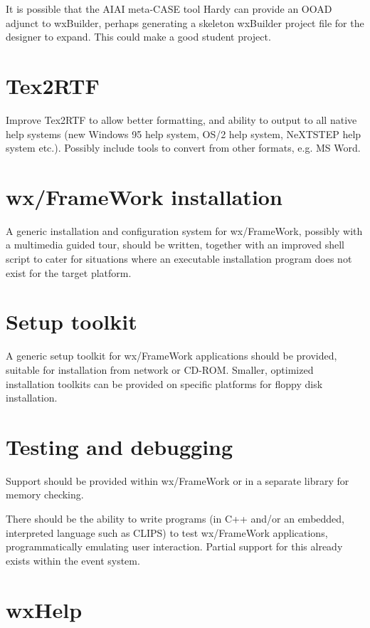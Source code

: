 It is possible that the AIAI meta-CASE tool Hardy can provide an OOAD
adjunct to wxBuilder, perhaps generating a skeleton wxBuilder project file for
the designer to expand. This could make a good student project.

\section{Tex2RTF}

Improve Tex2RTF to allow better formatting, and ability to output to
all native help systems (new Windows 95 help system, OS/2 help system,
NeXTSTEP help system etc.). Possibly include tools to convert from other
formats, e.g. MS Word.

\section{wx/FrameWork installation}

A generic installation and configuration system for wx/FrameWork,
possibly with a multimedia guided tour, should be written, together with
an improved shell script to cater for situations where an executable
installation program does not exist for the target platform.

\section{Setup toolkit}

A generic setup toolkit for wx/FrameWork applications should be
provided, suitable for installation from network or CD-ROM. Smaller,
optimized installation toolkits can be provided on specific platforms
for floppy disk installation.

\section{Testing and debugging}

Support should be provided within wx/FrameWork or in a separate library
for memory checking.

There should be the ability to write programs (in C++ and/or an
embedded, interpreted language such as CLIPS) to test wx/FrameWork
applications, programmatically emulating user interaction. Partial
support for this already exists within the event system.

\section{wxHelp}

